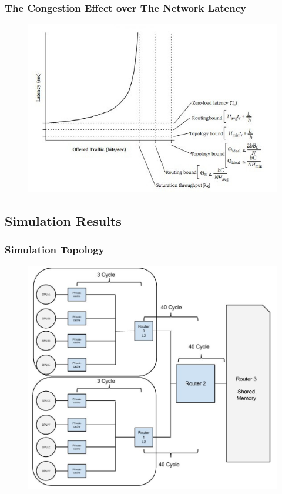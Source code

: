 \documentclass{beamer}
\begin{document}

\begin{frame}[plain]
	\frametitle{The Congestion Effect over The Network Latency}
		\begin{figure}
			\includegraphics[width=1\linewidth]{img/latency_graph.jpg}
		\end{figure}
\end{frame}


\subsection{Simulation Results}
\begin{frame}[plain]
	\frametitle{Simulation Topology}
		\begin{figure}
			\includegraphics[width=0.8\linewidth]{img/simulation.jpg}
		\end{figure}
\end{frame}
\end{document}
